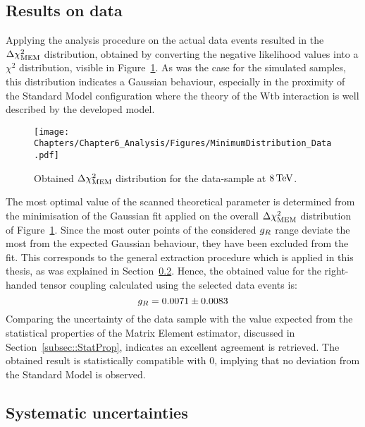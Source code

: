\subsection{Results on data}
Applying the analysis procedure on the actual data events resulted in the $\Delta \chi^{2}_{\textrm{MEM}}$ distribution, obtained by converting the negative likelihood values into a $\chi^{2}$ distribution, visible in Figure~\ref{fig::MinData}.
As was the case for the simulated samples, this distribution indicates a Gaussian behaviour, especially in the proximity of the Standard Model configuration where the theory of the Wtb interaction is well described by the developed model.
\begin{figure}[h!t]
 \centering
 \texttt{[image: Chapters/Chapter6\_Analysis/Figures/MinimumDistribution\_Data.pdf]}
 \caption{Obtained $\Delta \chi^{2}_{\textrm{MEM}}$ distribution for the data-sample at $8 \, \mathrm{TeV}$.} \label{fig::MinData}
\end{figure}

The most optimal value of the scanned theoretical parameter is determined from the minimisation of the Gaussian fit applied on the overall $\Delta \chi^{2}_{\textrm{MEM}}$ distribution of Figure~\ref{fig::MinData}.
Since the most outer points of the considered $g_{R}$ range deviate the most from the expected Gaussian behaviour, they have been excluded from the fit.
This corresponds to the general extraction procedure which is applied in this thesis, as was explained in Section~\ref{}.
Hence, the obtained value for the right-handed tensor coupling calculated using the selected data events is:
\begin{equation} \label{eq::DataResult}
 g_{R} = 0.0071 \pm 0.0083
\end{equation}
Comparing the uncertainty of the data sample with the value expected from the statistical properties of the Matrix Element estimator, discussed in Section~\ref{subsec::StatProp}, indicates an excellent agreement is retrieved.
The obtained result is statistically compatible with $0$, implying that no deviation from the Standard Model is observed.

\subsection{Systematic uncertainties}

